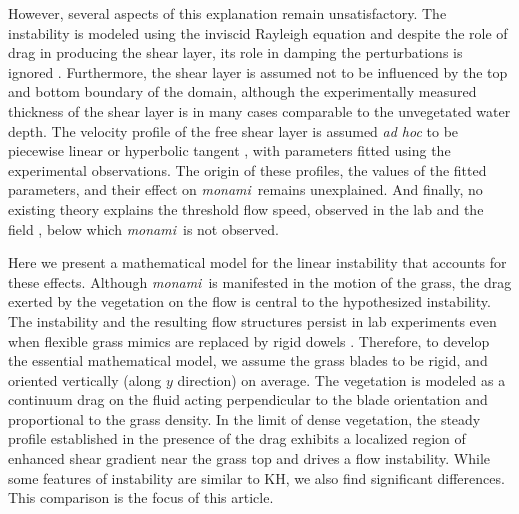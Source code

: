\documentclass{jfm}
\newcommand{\monami}{\textit{monami}}
\begin{document}
However, several aspects of this explanation remain unsatisfactory. 
The instability is modeled using the inviscid Rayleigh equation and despite the role of drag in producing the shear layer, its role in damping the perturbations is ignored \citep{Raupach96}. 
Furthermore, the shear layer is assumed not to be influenced by the top and bottom boundary of the domain, although the experimentally measured thickness of the shear layer is in many cases comparable to the unvegetated water depth.
The velocity profile of the free shear layer is assumed \textit{ad hoc} to be piecewise linear \citep{Delangre06} or hyperbolic tangent \citep{Ghisal02,Raupach96}, with parameters fitted using the experimental observations.
The origin of these profiles, the values of the fitted parameters, and their effect on \monami~remains unexplained.  
And finally, no existing theory explains the threshold flow speed, observed in the lab \citep{Ghisal02} and the field \citep{Grizzle96}, below which \monami ~is not observed.

Here we present a mathematical model for the linear instability that accounts for these effects.
Although \monami ~is manifested in the motion of the grass, the drag exerted by the vegetation on the flow is central to the hypothesized instability. 
The instability and the resulting flow structures persist in lab experiments even when flexible grass mimics are replaced by rigid dowels \citep{Ghisal02,Nepf06}. 
Therefore, to develop the essential mathematical model, we assume the grass blades to be rigid, and oriented vertically (along $y$ direction) on average.
The vegetation is modeled as a continuum drag on the fluid acting perpendicular to the blade orientation and proportional to the grass density.
In the limit of dense vegetation, the steady profile established in the presence of the drag exhibits a localized region of enhanced shear gradient near the grass top and drives a flow instability.
While some features of instability are similar to KH, we also find significant differences.
This comparison is the focus of this article.
\end{document}
